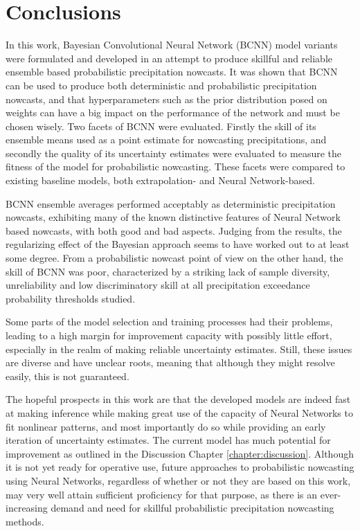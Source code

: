 \chapter{Conclusions}
\label{chapter:conclusions}


In this work, Bayesian Convolutional Neural Network (BCNN) model variants were formulated and developed in an attempt to produce skillful and reliable ensemble based probabilistic precipitation nowcasts. It was shown that BCNN can be used to produce both deterministic and probabilistic precipitation nowcasts, and that hyperparameters such as the prior distribution posed on weights can have a big impact on the performance of the network and must be chosen wisely. Two facets of BCNN were evaluated. Firstly the skill of its ensemble means used as a point estimate for nowcasting precipitations, and secondly the quality of its uncertainty estimates were evaluated to measure the fitness of the model for probabilistic nowcasting. These facets were compared to existing baseline models, both extrapolation- and Neural Network-based. 

BCNN ensemble averages performed acceptably as deterministic precipitation nowcasts, exhibiting many of the known distinctive features of Neural Network based nowcasts, with both good and bad aspects. Judging from the results, the regularizing effect of the Bayesian approach seems to have worked out to at least some degree. From a probabilistic nowcast point of view on the other hand, the skill of BCNN was poor, characterized by a striking lack of sample diversity, unreliability and low discriminatory skill at all precipitation exceedance probability thresholds studied.

Some parts of the model selection and training processes had their problems, leading to a high margin for improvement capacity with possibly little effort, especially in the realm of making reliable uncertainty estimates. Still, these issues are diverse and have unclear roots, meaning that although they might resolve easily, this is not guaranteed. 

The hopeful prospects in this work are that the developed models are indeed fast at making inference while making great use of the capacity of Neural Networks to fit nonlinear patterns, and most importantly do so while providing an early iteration of uncertainty estimates. The current model has much potential for improvement as outlined in the Discussion Chapter \ref{chapter:discussion}. Although it is not yet ready for operative use, future approaches to probabilistic nowcasting using Neural Networks, regardless of whether or not they are based on this work, may very well attain sufficient proficiency for that purpose, as there is an ever-increasing demand and need for skillful probabilistic precipitation nowcasting methods.